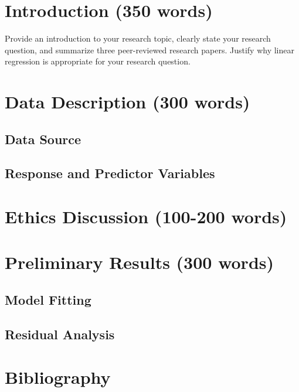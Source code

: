 \documentclass[
  letterpaper,
  DIV=11,
  numbers=noendperiod]{scrartcl}
\begin{document}
\section{Introduction (350 words)}\label{introduction-350-words}

Provide an introduction to your research topic, clearly state your
research question, and summarize three peer-reviewed research papers.
Justify why linear regression is appropriate for your research question.

\section{Data Description (300 words)}\label{data-description-300-words}

\subsection{Data Source}\label{data-source}

\subsection{Response and Predictor
Variables}\label{response-and-predictor-variables}

\section{Ethics Discussion (100-200
words)}\label{ethics-discussion-100-200-words}

\section{Preliminary Results (300
words)}\label{preliminary-results-300-words}

\subsection{Model Fitting}\label{model-fitting}

\subsection{Residual Analysis}\label{residual-analysis}

\section{Bibliography}\label{bibliography}
\end{document}
